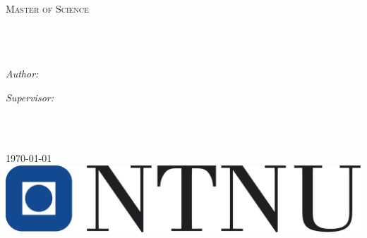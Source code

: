 \documentclass[12pt, oneside]{Thesis} %
\begin{document}
\begin{titlepage}
\begin{center}

\textsc{\LARGE \univname}\\[1.5cm] %
\textsc{\Large Master of Science}\\[0.5cm] %

\HRule \\[0.4cm] %
{\huge \bfseries \ttitle}\\[0.4cm] %
\HRule \\[1.5cm] %
 
\begin{minipage}{0.4\textwidth}
\begin{flushleft} \large
\emph{Author:}\\
{\authornames} %
\end{flushleft}
\end{minipage}
\begin{minipage}{0.4\textwidth}
\begin{flushright} \large
\emph{Supervisor:} \\
\href{\supurl}{\supname} %
\end{flushright}
\end{minipage}\\[3cm]
 
\deptname\ %
 
{\large \today}\\[4cm] %
\includegraphics{Figures/logo-ntnu.png} %
 
\vfill
\end{center}

\end{titlepage}


\end{document}
